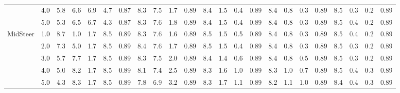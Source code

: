 \begin{table}
{\begin{tabular}{lc|cc|ccc|cccc|cccc|cccc|cccc}
 & 4.0 & 5.8 & 6.6 & 6.9 & 4.7 & 0.87 & 8.3 & 7.5 & 1.7 & 0.89 & 8.4 & 1.5 & 0.4 & 0.89 & 8.4 & 0.8 & 0.3 & 0.89 & 8.5 & 0.3 & 0.2 & 0.89 \\
 & 5.0 & 5.3 & 6.5 & 6.7 & 4.3 & 0.87 & 8.3 & 7.6 & 1.8 & 0.89 & 8.4 & 1.5 & 0.4 & 0.89 & 8.4 & 0.8 & 0.3 & 0.89 & 8.5 & 0.4 & 0.2 & 0.89 \\
\cline{1-23}
\multirow{5}{*}{MidSteer} & 1.0 & 8.7 & 1.0 & 1.7 & 8.5 & 0.89 & 8.3 & 7.6 & 1.6 & 0.89 & 8.5 & 1.5 & 0.5 & 0.89 & 8.4 & 0.8 & 0.3 & 0.89 & 8.5 & 0.4 & 0.2 & 0.89 \\
 & 2.0 & 7.3 & 5.0 & 1.7 & 8.5 & 0.89 & 8.4 & 7.6 & 1.7 & 0.89 & 8.5 & 1.5 & 0.4 & 0.89 & 8.4 & 0.8 & 0.3 & 0.89 & 8.5 & 0.3 & 0.2 & 0.89 \\
 & 3.0 & 5.7 & 7.7 & 1.7 & 8.5 & 0.89 & 8.3 & 7.5 & 2.0 & 0.89 & 8.4 & 1.4 & 0.6 & 0.89 & 8.4 & 0.8 & 0.5 & 0.89 & 8.5 & 0.3 & 0.2 & 0.89 \\
 & 4.0 & 5.0 & 8.2 & 1.7 & 8.5 & 0.89 & 8.1 & 7.4 & 2.5 & 0.89 & 8.3 & 1.6 & 1.0 & 0.89 & 8.3 & 1.0 & 0.7 & 0.89 & 8.5 & 0.4 & 0.3 & 0.89 \\
 & 5.0 & 4.3 & 8.3 & 1.7 & 8.5 & 0.89 & 7.8 & 6.9 & 3.2 & 0.89 & 8.3 & 1.7 & 1.1 & 0.89 & 8.2 & 1.1 & 1.0 & 0.89 & 8.4 & 0.4 & 0.3 & 0.89 \\
\bottomrule
\end{tabular}}
\end{table}
